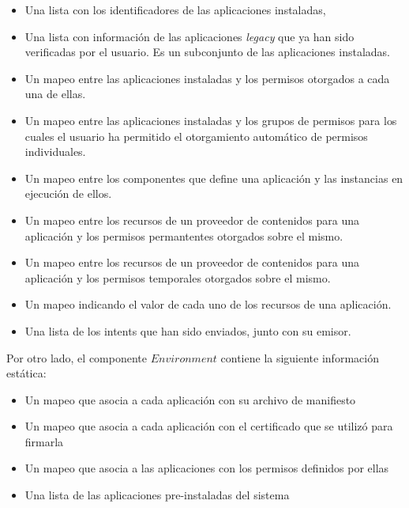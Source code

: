 \begin{itemize}
    \item Una lista con los identificadores de las aplicaciones instaladas,
    \item Una lista con información de las aplicaciones \textit{legacy} que ya han sido verificadas
          por el usuario. Es un subconjunto de las aplicaciones instaladas.
    \item Un mapeo entre las aplicaciones instaladas y los permisos otorgados a cada una de ellas.
    \item Un mapeo entre las aplicaciones instaladas y los grupos de permisos para los cuales el
          usuario ha permitido el otorgamiento automático de permisos individuales.
    \item Un mapeo entre los componentes que define una aplicación y las instancias en ejecución de
          ellos.
    \item Un mapeo entre los recursos de un proveedor de contenidos para una aplicación y los
          permisos permantentes otorgados sobre el mismo.
    \item Un mapeo entre los recursos de un proveedor de contenidos para una aplicación y los
          permisos temporales otorgados sobre el mismo.
    \item Un mapeo indicando el valor de cada uno de los recursos de una aplicación.
    \item Una lista de los intents que han sido enviados, junto con su emisor.
\end{itemize}

Por otro lado, el componente $Environment$ contiene la siguiente información estática:

\begin{itemize}
    \item Un mapeo que asocia a cada aplicación con su archivo de manifiesto
    \item Un mapeo que asocia a cada aplicación con el certificado que se utilizó para firmarla
    \item Un mapeo que asocia a las aplicaciones con los permisos definidos por ellas
    \item Una lista de las aplicaciones pre-instaladas del sistema
\end{itemize}

